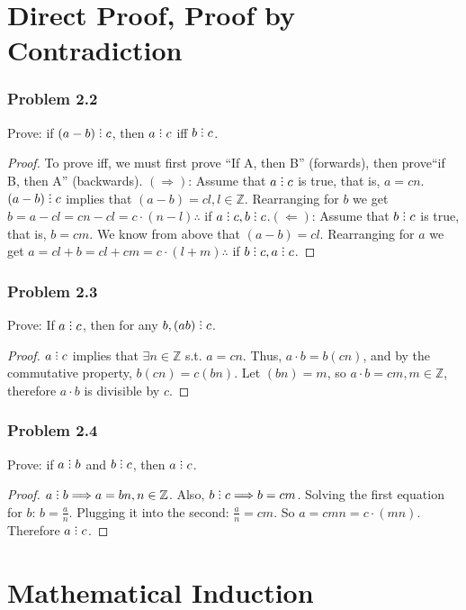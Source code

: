 \documentclass[hidelinks,12pt]{article}
\newcommand{\Z}{\mathbb{Z}}
\newcommand{\divby}{%
  \mathrel{\text{\vbox{\baselineskip.65ex\lineskiplimit0pt\hbox{.}\hbox{.}\hbox{.}}}}%
  }
\begin{document}
\newpage
\section{Direct Proof, Proof by Contradiction}
\subsubsection{Problem 2.2}
Prove: if $(a-b)\divby c$, then $a\divby c$ iff $b\divby c$.
\begin{proof}
To prove iff, we must first prove ``If A, then B'' (forwards), then prove``if B, then A'' (backwards). \newline $(\Longrightarrow)$: Assume that $a\divby c$ is true, that is, $a=cn$. $(a-b)\divby c$ implies that $(a-b)=cl, l\in \Z$. Rearranging for $b$ we get $b=a-cl=cn-cl=c\cdot(n-l)\therefore$ if $a\divby c, b\divby c$.\newline $(\Longleftarrow)$: Assume that $b\divby c$ is true, that is, $b=cm$. We know from above that $(a-b)=cl$. Rearranging for $a$ we get $a=cl+b=cl+cm=c\cdot(l+m) \therefore$ if $b\divby c, a\divby c$.
\end{proof}
\subsubsection{Problem 2.3}
Prove: If $a\divby c$, then for any $b,(ab)\divby c$.
\begin{proof}
$a\divby c$ implies that $\exists n \in \Z$ s.t. $a=cn$. Thus, $a\cdot b=b(cn)$, and by the commutative property, $b(cn)=c(bn)$. Let $(bn)=m$, so $a\cdot b=cm, m\in \Z$, therefore $a\cdot b$ is divisible by $c$.
\end{proof}
\subsubsection{Problem 2.4}
Prove: if $a\divby b$ and $b\divby c$, then $a\divby c$.
\begin{proof}
$a\divby b \Longrightarrow a=bn, n\in \Z$. Also, $b\divby c \Longrightarrow b=cm$. Solving the first equation for $b$: $b=\frac{a}{n}$. Plugging it into the second: $\frac{a}{n}=cm$. So $a=cmn=c\cdot (mn)$. Therefore $a\divby c$.
\end{proof}
\newpage
\section{Mathematical Induction}
\end{document}
